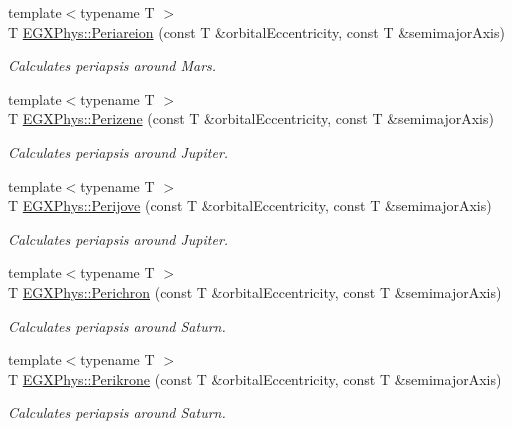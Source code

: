 \begin{DoxyCompactItemize}
{\footnotesize template$<$typename T $>$ }\\T \mbox{\hyperlink{group___e_g_x_phys-_periapsis_ga0617ba07a30b0fd0544c02f691bfae26}{E\+G\+X\+Phys\+::\+Periareion}} (const T \&orbital\+Eccentricity, const T \&semimajor\+Axis)
\begin{DoxyCompactList}\small\item\em Calculates periapsis around Mars. \end{DoxyCompactList}\item 
{\footnotesize template$<$typename T $>$ }\\T \mbox{\hyperlink{group___e_g_x_phys-_periapsis_ga0523c65b7fc26e675388b2c3d38aa00b}{E\+G\+X\+Phys\+::\+Perizene}} (const T \&orbital\+Eccentricity, const T \&semimajor\+Axis)
\begin{DoxyCompactList}\small\item\em Calculates periapsis around Jupiter. \end{DoxyCompactList}\item 
{\footnotesize template$<$typename T $>$ }\\T \mbox{\hyperlink{group___e_g_x_phys-_periapsis_ga075052f7ff9aa1d5fdf4501b493be86b}{E\+G\+X\+Phys\+::\+Perijove}} (const T \&orbital\+Eccentricity, const T \&semimajor\+Axis)
\begin{DoxyCompactList}\small\item\em Calculates periapsis around Jupiter. \end{DoxyCompactList}\item 
{\footnotesize template$<$typename T $>$ }\\T \mbox{\hyperlink{group___e_g_x_phys-_periapsis_ga12b5e99aa2e3e7031ef6ce93060cf516}{E\+G\+X\+Phys\+::\+Perichron}} (const T \&orbital\+Eccentricity, const T \&semimajor\+Axis)
\begin{DoxyCompactList}\small\item\em Calculates periapsis around Saturn. \end{DoxyCompactList}\item 
{\footnotesize template$<$typename T $>$ }\\T \mbox{\hyperlink{group___e_g_x_phys-_periapsis_gaa56f74c44a3583b8f0d13b821c1d7422}{E\+G\+X\+Phys\+::\+Perikrone}} (const T \&orbital\+Eccentricity, const T \&semimajor\+Axis)
\begin{DoxyCompactList}\small\item\em Calculates periapsis around Saturn. \end{DoxyCompactList}\item 

\end{DoxyCompactItemize}
